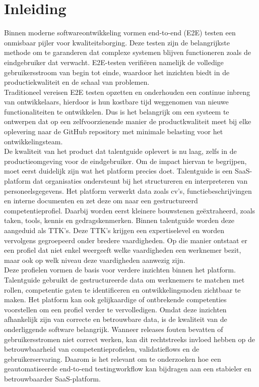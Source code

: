 
\section{Inleiding}%
\label{sec:inleiding}

Binnen moderne softwareontwikkeling vormen end-to-end (E2E) testen een onmisbaar pijler voor kwaliteitsborging. Deze testen zijn de belangrijkste methode om te garanderen dat complexe systemen blijven functioneren zoals de eindgebruiker dat verwacht. E2E-testen verifiëren namelijk de volledige gebruikersstroom van begin tot einde, waardoor het inzichten biedt in de productiekwaliteit en de schaal van problemen.
\bigskip
\\
Traditioneel vereisen E2E testen opzetten en onderhouden een continue inbreng van ontwikkelaars, hierdoor is hun kostbare tijd weggenomen van nieuwe functionaliteiten te ontwikkelen. Dus is het belangrijk om een systeem te ontwerpen dat op een zelfvoorzienende manier de productkwaliteit meet bij elke oplevering naar de GitHub repository met minimale belasting voor het ontwikkelingsteam. 
\bigskip
\\
De kwaliteit van het product dat talentguide oplevert is nu laag, zelfs in de productieomgeving voor de eindgebruiker. Om de impact hiervan te begrijpen, moet eerst duidelijk zijn wat het platform precies doet. Talentguide is een SaaS-platform dat organisaties ondersteunt bij het structureren en interpreteren van personeelsgegevens. Het platform verwerkt data zoals cv’s, functiebeschrijvingen en interne documenten en zet deze om naar een gestructureerd competentieprofiel. Daarbij worden eerst kleinere bouwstenen geëxtraheerd, zoals taken, tools, kennis en gedragskenmerken. Binnen talentguide worden deze aangeduid als TTK’s. Deze TTK’s krijgen een expertiselevel en worden vervolgens gegroepeerd onder bredere vaardigheden. Op die manier ontstaat er een profiel dat niet enkel weergeeft welke vaardigheden een werknemer bezit, maar ook op welk niveau deze vaardigheden aanwezig zijn.
\bigskip
\\
Deze profielen vormen de basis voor verdere inzichten binnen het platform. Talentguide gebruikt de gestructureerde data om werknemers te matchen met rollen, competentie gaten te identificeren en ontwikkelingsnoden zichtbaar te maken. Het platform kan ook gelijkaardige of ontbrekende competenties voorstellen om een profiel verder te vervolledigen. Omdat deze inzichten afhankelijk zijn van correcte en betrouwbare data, is de kwaliteit van de onderliggende software belangrijk. Wanneer releases fouten bevatten of gebruikersstromen niet correct werken, kan dit rechtstreeks invloed hebben op de betrouwbaarheid van competentieprofielen, validatieflows en de gebruikerservaring. Daarom is het relevant om te onderzoeken hoe een geautomatiseerde end-to-end testingworkflow kan bijdragen aan een stabieler en betrouwbaarder SaaS-platform.
